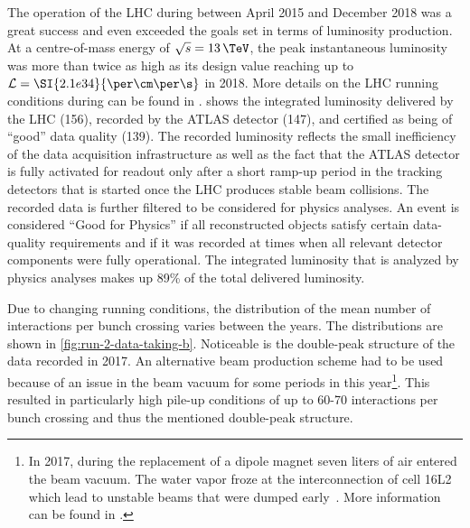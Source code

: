 The operation of the LHC during \RunTwo between April 2015 and December 2018 was a great success and even exceeded the goals set in terms of luminosity production. At a centre-of-mass energy of $\sqrt{s} = 13\,\TeV$, the peak instantaneous luminosity was more than twice as high as its design value reaching up to $\instLumi = \SI{2.1e34}{\per\cm\per\s}$ in 2018. More details on the LHC running conditions during \RunTwo can be found in .
 shows the integrated luminosity delivered by the LHC (156\ifb), recorded by the ATLAS detector (147\ifb), and certified as being of ``good'' data quality (139\ifb).
The recorded luminosity reflects the small inefficiency of the data acquisition infrastructure as well as the fact that the ATLAS detector is fully activated for readout only after a short ramp-up period in the tracking detectors that is started once the LHC produces stable beam collisions.
The recorded data is further filtered to be considered for physics analyses.
An event is considered ``Good for Physics'' if all reconstructed objects satisfy certain data-quality requirements and if it was recorded at times when all relevant detector components were fully operational.
The integrated luminosity that is analyzed by physics analyses makes up 89\% of the total delivered luminosity.

Due to changing running conditions, the distribution of the mean number of interactions per bunch crossing varies between the years.
The distributions are shown in \cref{fig:run-2-data-taking-b}.
Noticeable is the double-peak structure of the data recorded in 2017.
An alternative beam production scheme had to be used because of an issue in the beam vacuum for some periods in this year\footnote{In 2017, during the replacement of a dipole magnet seven liters of air entered the beam vacuum. The water vapor froze at the interconnection of cell 16L2 which lead to unstable beams that were dumped early~\cite{Jimenez:2646067,Salvant:2646056}. More information can be found in .}. This resulted in particularly high pile-up conditions of up to 60-70 interactions per bunch crossing and thus the mentioned double-peak structure.


